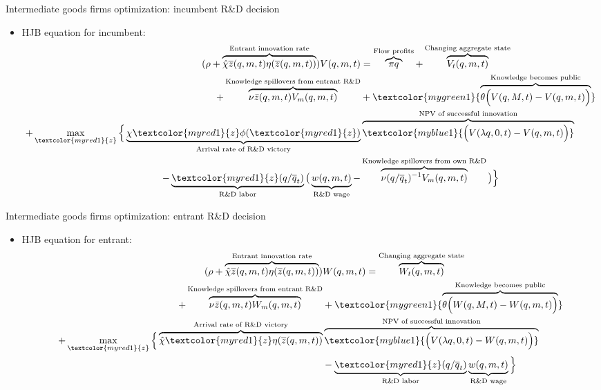 \documentclass[english,usenames,dvipsnames]{beamer}
\begin{document}
\begin{frame}{Intermediate goods firms optimization: incumbent R\&D decision}
\begin{itemize}
	\item HJB equation for incumbent:
	\footnotesize
	\begin{align*}
	(\rho + \overbrace{\hat{\chi} \overline{z}(q,m,t)\eta(\overline{z}(q,m,t))}^{\text{Entrant innovation rate}}) V(q,m,t) &= \overbrace{\pi q}^{\text{Flow profits}} + \overbrace{V_t(q,m,t)}^{\text{Changing aggregate state}} \\ 
	 +  \overbrace{\nu \bar{z}(q,m,t) V_m(q,m,t)}^{\text{Knowledge spillovers from entrant R\&D}} & + \textcolor{mygreen1}{\overbrace{\theta \Big(V(q,M,t) - V(q,m,t)\Big)}^{\text{Knowledge becomes public}}}\\
	 + \max_{\textcolor{myred1}{z}} \Big\{\underbrace{\chi \textcolor{myred1}{z}\phi(\textcolor{myred1}{z})}_{\text{Arrival rate of R\&D victory}} &\overbrace{\textcolor{myblue1}{\Big(V(\lambda q,0,t)-V(q,m,t)\Big)}}^{\text{NPV of successful innovation}} \\
	 -\underbrace{\textcolor{myred1}{z}(q/\overline{q}_t)}_{\text{R\&D labor}} \big(\underbrace{w(q,m,t)}_{\text{R\&D wage}} - & \overbrace{\nu (q/\overline{q}_t)^{-1} V_m(q,m,t)}^{\text{Knowledge spillovers from own R\&D}}\big)\Big \} 
	\end{align*}
\end{itemize}
\end{frame}

\begin{frame}{Intermediate goods firms optimization: entrant R\&D decision}
\begin{itemize}
	\item HJB equation for entrant: 
	\footnotesize
	\begin{align*}
	(\rho +  \overbrace{\hat{\chi} \overline{z}(q,m,t)\eta(\overline{z}(q,m,t))}^{\text{Entrant innovation rate}}) & W(q,m,t) = \overbrace{W_t(q,m,t)}^{\text{Changing aggregate state}} \\
	 + \overbrace{\nu \bar{z}(q,m,t) W_m(q,m,t)}^{\text{Knowledge spillovers from entrant R\&D}} &+ \textcolor{mygreen1}{\overbrace{\theta \Big(W(q,M,t) - W(q,m,t)\Big)}^{\text{Knowledge becomes public}}} \\
	 + \max_{\textcolor{myred1}{z}} \Big \{ \overbrace{\hat{\chi} {\textcolor{myred1}{z}} \eta(\overline{z}(q,m,t))}^{\text{Arrival rate of R\&D victory}} & \overbrace{\textcolor{myblue1}{\Big( V(\lambda q,0,t) - W(q,m,t) \Big)}}^{\text{NPV of successful innovation}} \\
	& - \underbrace{\textcolor{myred1}{z}(q/\overline{q}_t)}_{\text{R\&D labor}} \underbrace{w(q,m,t)}_{\text{R\&D wage}}  \Big\}
	\end{align*}
\end{itemize}
\end{frame}
\end{document}
